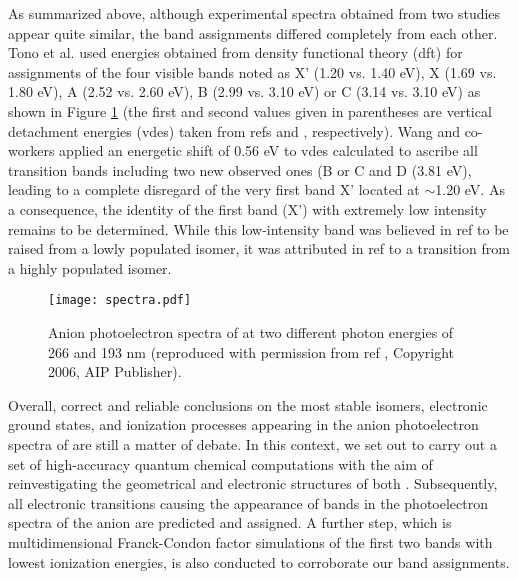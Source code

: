 \begin{refsection}
As summarized above, although experimental spectra obtained from two studies \cite{Tono2003B, Zhai06} appear quite similar, the band assignments differed completely from each other. Tono et al. \cite{Tono2003B} used energies obtained from density functional theory (\acrshort{dft}) for assignments of the four visible bands noted as X' (1.20 vs. 1.40 eV), X (1.69 vs. 1.80 eV), A (2.52 vs. 2.60 eV), B (2.99 vs. 3.10 eV) or C (3.14 vs. 3.10 eV) as shown in Figure \ref{fig:spectra} \cite{Zhai06} (the first and second values given in parentheses are vertical detachment energies (\acrshort{vde}s) taken from refs  and , respectively). Wang and co-workers \cite{Zhai06} applied an energetic shift of 0.56 eV to \acrshort{vde}s calculated\cite{Tono2003B} to ascribe all transition bands including two new observed ones (B or C and D (3.81 eV), leading to a complete disregard of the very first band X' located at $\sim$1.20 eV. As a consequence, the identity of the first band (X') with extremely low intensity remains to be determined. While this low-intensity band was believed in ref  to be raised from a lowly populated isomer, \cite{Zhai06} it was attributed in ref  to a transition from a highly populated isomer.\cite{Tono2003B} 


\begin{figure}[htb!]
	\centering
	\texttt{[image: spectra.pdf]}
	\caption{Anion photoelectron spectra of  at two different photon energies of 266 and 193 nm (reproduced with permission from ref , Copyright 2006, AIP Publisher).}
	\label{fig:spectra}
\end{figure}


Overall, correct and reliable conclusions on the most stable isomers, electronic ground states, and ionization processes appearing in the anion photoelectron spectra of  are still a matter of debate. In this context, we set out to carry out a set of high-accuracy quantum chemical computations with the aim of reinvestigating the geometrical and electronic structures of both . Subsequently, all electronic transitions causing the appearance of bands in the photoelectron spectra of the anion  are predicted and assigned. A further step, which is multidimensional Franck-Condon factor simulations of the first two bands with lowest ionization energies, is also conducted to corroborate our band assignments. 





\end{refsection}
